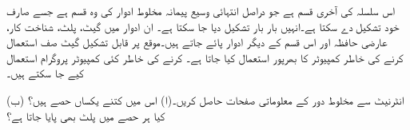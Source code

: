 اس سلسلہ کی آخری قسم  ہے جو دراصل انتہائی وسیع پیمانہ مخلوط ادوار کی وہ قسم ہے جسے   صارف خود تشکیل دے سکتا ہے۔انہیں بار بار تشکیل دیا جا سکتا ہے۔ ان  ادوار میں گیٹ، پلٹ، شناخت کار، عارضی حافظہ اور اس قسم کے دیگر ادوار پائے جاتے ہیں۔موقع  پر قابل  تشکیل گیٹ صف استعمال کرنے کی خاطر کمپیوٹر کا بھرپور استعمال کیا جاتا ہے۔  کرنے کی خاطر کئی  کمپیوٹر پروگرام استعمال کیے جا سکتے ہیں۔ 

انٹرنیٹ سے  مخلوط دور کے معلوماتی صفحات حاصل کریں۔(ا) اس میں کتنے یکساں حصے ہیں؟ (ب) کیا ہر حصے میں پلٹ بھی پایا جاتا ہے؟
